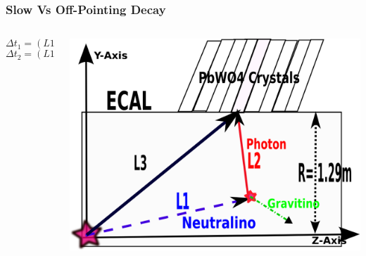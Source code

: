 \documentclass{beamer}
\begin{document}
\begin{frame}
\frametitle{Slow Vs Off-Pointing Decay}
  \begin{minipage}[t]{0.80\paperwidth}
    \begin{columns}
     \begin{column}{0.55\linewidth}
      \begin{tcolorbox}[colback=UNL@Cream!5,colframe=UNL@Cream!70,title=\textcolor{UMN@Maroon}{\textbf{Photon Measured Time}}]
          $$\Delta t_{1} = (L1/c\beta) - (L1/c)$$
          $$\Delta t_{2} = (L1 + L2 - L3)/c $$   
           
        \end{tcolorbox}
      \end{column}
      \begin{column}{0.50\linewidth}
       \begin{tcolorbox}[colback=UNL@Cream!5,colframe=UNL@Cream!70,title=\textcolor{UMN@Maroon}{\textbf{ }}]
           \includegraphics[height=0.5\linewidth, width=0.85\linewidth]{THESISPLOTS/DelayedPhoton-ECAL.png}
       \end{tcolorbox}
      \end{column}
     \end{columns}
  \end{minipage}
  

\end{frame}
\end{document}
